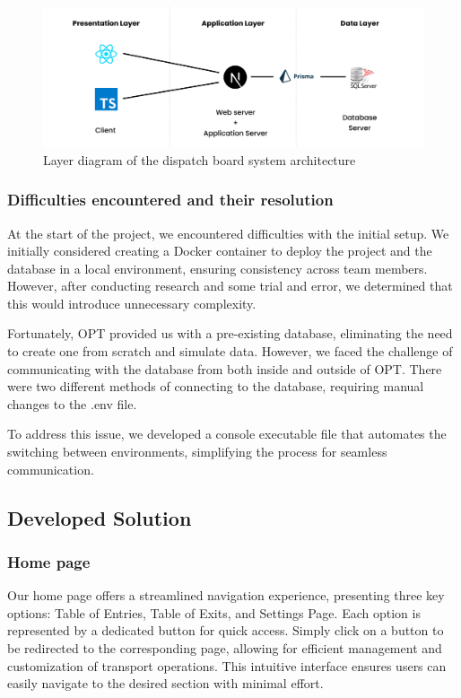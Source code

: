 \documentclass[10pt]{article}
\begin{document}
        \begin{figure}[h]
            \centering
            \includegraphics[width=1\textwidth]{architecture_diagram}
            \caption{Layer diagram of the dispatch board system architecture}
            \label{fig:architecture_diagram}
        \end{figure}

        \subsubsection{Difficulties encountered and their resolution}
        At the start of the project, we encountered difficulties with the initial setup. We initially considered creating a Docker container to deploy the project and the database in a local environment, ensuring consistency across team members. However, after conducting research and some trial and error, we determined that this would introduce unnecessary complexity.

        Fortunately, OPT provided us with a pre-existing database, eliminating the need to create one from scratch and simulate data. However, we faced the challenge of communicating with the database from both inside and outside of OPT. There were two different methods of connecting to the database, requiring manual changes to the .env file.

        To address this issue, we developed a console executable file that automates the switching between environments, simplifying the process for seamless communication.
        \subsection{Developed Solution}

        \subsubsection{Home page}

        Our home page offers a streamlined navigation experience, presenting three key options: Table of Entries, Table of Exits, and Settings Page. Each option is represented by a dedicated button for quick access. Simply click on a button to be redirected to the corresponding page, allowing for efficient management and customization of transport operations. This intuitive interface ensures users can easily navigate to the desired section with minimal effort.
\end{document}

